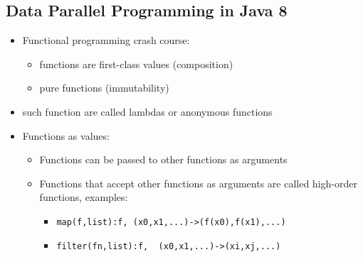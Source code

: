 \documentclass[a4paper]{article}
\newcommand{\inline}[1]{\lstinline!#1!}%
\begin{document}
\subsection{Data Parallel Programming in Java 8}
\begin{itemize}
\item Functional programming crash course: 
\begin{itemize}
\item functions are first-class values (composition)
\item  pure functions (immutability)
\end{itemize}
\item such function are called lambdas or anonymous functions
\item Functions as values: 
\begin{itemize}
\item Functions can be passed to other functions as arguments 
\item Functions that accept other functions as arguments are called high-order functions, examples:
\begin{itemize}
\item \inline{map(f,list):f, (x0,x1,...)->(f(x0),f(x1),...)}
\item \inline{filter(fn,list):f,  (x0,x1,...)->(xi,xj,...)}
\end{itemize}
\end{itemize}


\end{itemize}
\end{document}
